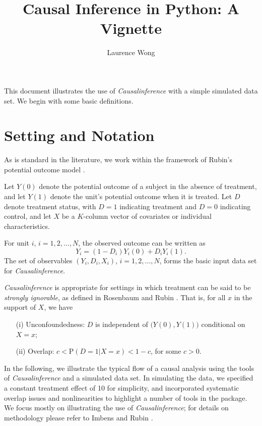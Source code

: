 \documentclass[12pt]{article}
\renewcommand{\P}{\mathrm{P}}
\theoremstyle{definition}
\theoremstyle{definition}
\theoremstyle{definition}
\theoremstyle{remark}
\begin{document}

\title{Causal Inference in Python: A Vignette}
\author{Laurence Wong}
\maketitle

This document illustrates the use of \textit{Causalinference} with a simple simulated data set. We begin with some basic definitions.

\section{Setting and Notation}

As is standard in the literature, we work within the framework of Rubin's potential outcome model \cite{Rubin.1974}.

Let $Y(0)$ denote the potential outcome of a subject in the absence of treatment, and let $Y(1)$ denote the unit's potential outcome when it is treated. Let $D$ denote treatment status, with $D=1$ indicating treatment and $D=0$ indicating control, and let $X$ be a $K$-column vector of covariates or individual characteristics.

For unit $i$, $i=1,2,\ldots,N$, the observed outcome can be written as
\[Y_i = (1-D_i) Y_i(0) + D_i Y_i(1).\]
The set of observables $(Y_i, D_i, X_i)$, $i=1,2,\ldots,N$, forms the basic input data set for \textit{Causalinference}.

\textit{Causalinference} is appropriate for settings in which treatment can be said to be \textit{strongly ignorable}, as defined in Rosenbaum and Rubin \citeyear{RosenbaumRubin.1983}. That is, for all $x$ in the support of $X$, we have
\begin{itemize}
\item[(i)] Unconfoundedness: $D$ is independent of $\big(Y(0), Y(1)\big)$ conditional on $X=x$;
\item[(ii)] Overlap: $c < \P(D=1|X=x) < 1-c$, for some $c>0$.
\end{itemize}

In the following, we illustrate the typical flow of a causal analysis using the tools of \textit{Causalinference} and a simulated data set. In simulating the data, we specified a constant treatment effect of 10 for simplicity, and incorporated systematic overlap issues and nonlinearities to highlight a number of tools in the package. We focus mostly on illustrating the use of \textit{Causalinference}; for details on methodology please refer to Imbens and Rubin \citeyear{ImbensRubin.2015}.
\end{document}
